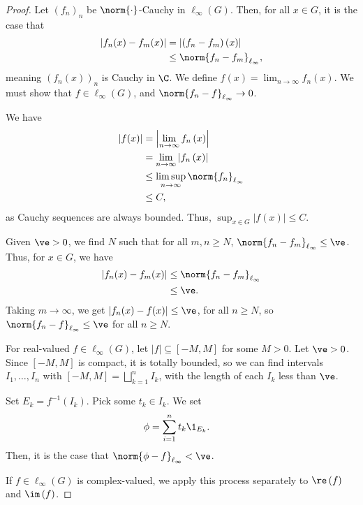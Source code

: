 \documentclass[10pt]{mypackage2}
\begin{document}
\begin{proof}
  Let $\left(f_n\right)_n$ be $\norm{\cdot}$-Cauchy in $\ell_{\infty}\left(G\right)$. Then, for all $x\in G$, it is the case that
  \begin{align*}
    \left\vert f_n(x) - f_m(x) \right\vert &= \left\vert \left(f_n - f_m\right)\left(x\right) \right\vert\\
                                           &\leq \norm{f_n - f_m}_{\ell_{\infty}},
  \end{align*}
  meaning $\left(f_n\left(x\right)\right)_n$ is Cauchy in $\C$. We define $f(x) = \lim_{n\rightarrow\infty}f_n(x)$. We must show that $f\in \ell_{\infty}\left(G\right)$, and $\norm{f_n-f}_{\ell_{\infty}}\rightarrow 0$.\newline

  We have
  \begin{align*}
    \left\vert f(x) \right\vert &= \left\vert \lim_{n\rightarrow\infty}f_n\left(x\right) \right\vert\\
                                &= \lim_{n\rightarrow\infty}\left\vert f_n\left(x\right) \right\vert\\
                                &\leq \limsup_{n\rightarrow\infty}\norm{f_n}_{\ell_{\infty}}\\
                                &\leq C,
  \end{align*}
  as Cauchy sequences are always bounded. Thus, $\sup_{x\in G}\left\vert f(x) \right\vert\leq C$.\newline

  Given $\ve > 0$, we find $N$ such that for all $m,n\geq N$, $\norm{f_n - f_m}_{\ell_{\infty}} \leq \ve$. Thus, for $x\in G$, we have
  \begin{align*}
    \left\vert f_n(x) - f_m(x) \right\vert &\leq \norm{f_n - f_m}_{\ell_{\infty}}\\
                                           &\leq \ve.
  \end{align*}
  Taking $m\rightarrow\infty$, we get $\left\vert f_n(x) - f(x) \right\vert \leq \ve$, for all $n\geq N$, so $\norm{f_n - f}_{\ell_{\infty}}\leq \ve$ for all $n\geq N$.\newline

  For real-valued $f\in \ell_{\infty}\left(G\right)$, let $\left\vert f \right\vert \subseteq \left[-M,M\right]$ for some $M > 0$. Let $\ve > 0$. Since $\left[-M,M\right]$ is compact, it is totally bounded, so we can find intervals $I_{1},\dots,I_n$ with $\left[-M,M\right] = \bigsqcup_{k=1}^{n}I_k$, with the length of each $I_k$ less than $\ve$.\newline

  Set $E_k = f^{-1}\left(I_k\right)$. Pick some $t_k\in I_k$. We set
  \begin{align*}
    \phi &= \sum_{i=1}^{n}t_k\1_{E_k}.
  \end{align*}
  Then, it is the case that $\norm{\phi - f}_{\ell_{\infty}} < \ve$.\newline

  If $f\in \ell_{\infty}(G)$ is complex-valued, we apply this process separately to $\re\left(f\right)$ and $\im\left(f\right)$.
\end{proof}
\end{document}
